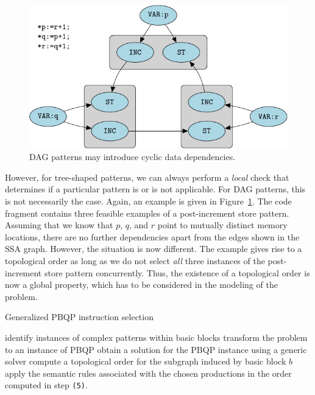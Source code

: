\begin{figure}[t]
    \includegraphics{fig/pgf-fig008}
  \caption{DAG patterns may introduce cyclic data dependencies.}\label{fig:topology}
\end{figure}

However, for tree-shaped patterns, we can always perform a
\emph{local} check that determines if a particular pattern is or is
not applicable. For DAG patterns, this is not necessarily the
case. Again, an example is given in Figure~\ref{fig:topology}.  The
code fragment contains three feasible examples of a post-increment
store pattern. Assuming that we know that $p$, $q$, and $r$ point to
mutually distinct memory locations, there are no further dependencies
apart from the edges shown in the SSA graph.  However, the situation
is now different.  The example gives rise to a topological order as
long as we do not select \emph{all} three instances of the
post-increment store pattern concurrently. Thus, the existence of a
topological order is now a global property, which has to be considered
in the modeling of the problem.

\begin{algorithm}
\caption{Generalized PBQP instruction selection}
\label{alg:pbqpisel}
\begin{algorithmic}[1]
  \STATE identify instances of complex patterns within basic blocks
  \STATE transform the problem to an instance of PBQP
  \STATE obtain a solution for the PBQP instance using a generic
  solver
    \STATE compute a topological order for the subgraph
    induced by basic block $b$
    \STATE apply the semantic rules associated with the chosen
    productions in the order computed in step \texttt{(5)}.
  \ENDFOR
\end{algorithmic}
\end{algorithm}

